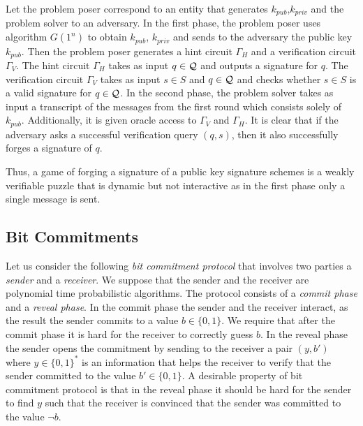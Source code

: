 Let the problem poser correspond to an entity that generates $k_{pub}$,$k_{priv}$ and the problem solver to an adversary.
In the first phase, the problem poser uses algorithm $G(1^n)$ to obtain $k_{pub}$, $k_{priv}$ and sends to the adversary the public key $k_{pub}$.
Then the problem poser generates a hint circuit $\Gamma_H$ and a verification circuit $\Gamma_V$.
The hint circuit $\Gamma_H$ takes as input $q \in \mathcal{Q}$ and outputs a signature for $q$. The verification circuit
$\Gamma_V$ takes as input $s \in S$ and $q \in \mathcal{Q}$ and checks whether $s \in S$ is a valid signature for $q \in \mathcal{Q}$.
In the second phase, the problem solver takes as input a transcript of the messages from the first round which consists solely of $k_{pub}$.
Additionally, it is given oracle access to $\Gamma_V$ and $\Gamma_H$.
It is clear that if the adversary asks a successful verification query $(q,s)$,
then it also successfully forges a signature of $q$.

Thus, a game of forging a signature of a public key signature schemes is a weakly verifiable puzzle that
is dynamic but not interactive as in the first phase only a single message is sent.
%
\subsection{Bit Commitments}
Let us consider the following \textit{bit commitment protocol} that involves two parties a \textit{sender} and a \textit{receiver}.
We suppose that the sender and the receiver are polynomial time probabilistic algorithms.
The protocol consists of a \textit{commit phase} and a \textit{reveal phase}.
In the commit phase the sender and the receiver interact, as the result the sender commits to a value $b \in \{0,1\}$.
We require that after the commit phase it is hard for the receiver to correctly guess $b$.
In the reveal phase the sender opens the commitment by sending to the receiver a pair $(y,b')$ where $y \in \{0,1\}^{*}$ is an information
that helps the receiver to verify that the sender committed to the value $b' \in \{0,1\}$.
A desirable property of bit commitment protocol is that in the reveal phase it should be hard for the sender to find $y$ such that the receiver
is convinced that the sender was committed to the value $\lnot b$.

